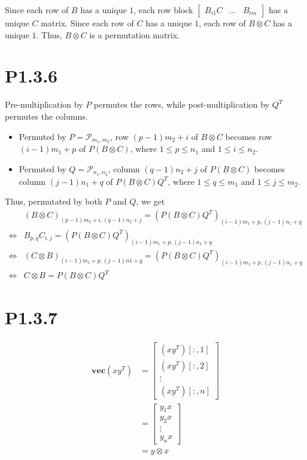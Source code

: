 \documentclass{article}
\newcommand{\vect}[1]{\textbf{vec}(#1)}
\begin{document}
Since each row of $B$ has a unique $1$,
each row block
$\begin{bmatrix}
        B_{i1}C & \dots & B_{im}
    \end{bmatrix}$
has a unique $C$ matrix. Since each row of $C$ has
a unique $1$, each row of $B\otimes C$ has a unique $1$.
Thus, $B \otimes C$ is a permutation matrix.

\section*{P1.3.6}
Pre-multiplication by $P$ permutes the rows, while post-multiplication by $Q^T$ permutes
the columns.
\begin{itemize}
    \item Permuted by $P=\mathcal{P}_{m_1,m_2}$,
          row ${(p-1)m_2+i}$ of $B\otimes C$ becomes row $(i-1)m_1+p$ of $P(B\otimes C)$,
          where $1 \le p \le n_1$ and $1 \le i \le n_2$.
    \item Permuted by $Q=\mathcal{P}_{n_1,n_2}$,
          column $(q-1)n_2+j$ of $P(B\otimes C)$ becomes column $(j-1)n_1+q$ of $P(B\otimes C)Q^T$,
          where $1 \le q \le m_1$ and $1 \le j \le m_2$.
\end{itemize}

Thus, permutated by both $P$ and $Q$, we get
\begin{align*}
         & (B\otimes C)_{(p-1)m_2+i,(q-1)n_2+j}  =(P(B\otimes C)Q^T)_{(i-1)m_1+p,(j-1)n_1+q}  \\
    \iff & B_{p,q}C_{i,j}                        = (P(B\otimes C)Q^T)_{(i-1)m_1+p,(j-1)n_1+q} \\
    \iff & (C\otimes B)_{(i-1)m_1+p,(j-1)n1+q} =  (P(B\otimes C)Q^T)_{(i-1)m_1+p,(j-1)n_1+q}  \\
    \iff & C\otimes B = P(B\otimes C)Q^T
\end{align*}

\section*{P1.3.7}
\begin{align*}
    \vect{xy^T} & =
    \begin{bmatrix}
        (xy^T)[:,1] \\
        (xy^T)[:,2] \\
        \vdots      \\
        (xy^T)[:,n]
    \end{bmatrix}              \\
                & =
    \begin{bmatrix}
        y_1x   \\
        y_2x   \\
        \vdots \\
        y_nx
    \end{bmatrix}              \\
                & = y \otimes x
\end{align*}
\end{document}
